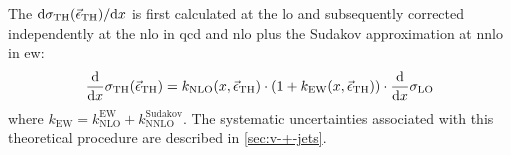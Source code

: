 The $\mathrm{d} \sigma_\mathrm{TH}(\vec{\epsilon}_\mathrm{TH})/\mathrm{d} x$ is first
calculated at the \gls{lo} and subsequently corrected independently at the
\gls{nlo} in \gls{qcd} and \gls{nlo} plus the Sudakov approximation at
\gls{nnlo} in \gls{ew}:
\begin{equation}
  \label{eq:176}
  \frac{\mathrm{d}}{\mathrm{d} x} \sigma_\mathrm{TH}(\vec{\epsilon}_\mathrm{TH}) =
  k_\mathrm{NLO}(x, \vec{\epsilon}_\mathrm{TH}) \cdot \left(1 + k_\mathrm{EW}(x,
    \vec{\epsilon}_\mathrm{TH}) \right) \cdot \frac{\mathrm{d}}{\mathrm{d} x} \sigma_\mathrm{LO}
\end{equation}
where $k_\mathrm{EW} = k_\mathrm{NLO}^\mathrm{EW} +
k_\mathrm{NNLO}^\mathrm{Sudakov}$. The systematic uncertainties associated with
this theoretical procedure are described in \cref{sec:v-+-jets}.
